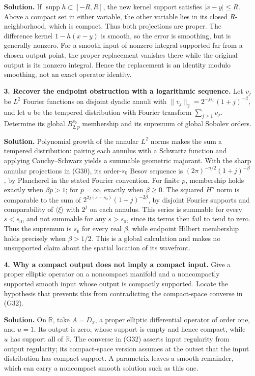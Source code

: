 \documentclass[
  11pt,
]{article}
\begin{document}
\textbf{Solution.} If \(\operatorname{supp}h\subset[-R,R]\), the new
kernel support satisfies \(|x-y|\leq R\). Above a compact set in either
variable, the other variable lies in its closed \(R\)-neighborhood,
which is compact. Thus both projections are proper. The difference
kernel \(1-h(x-y)\) is smooth, so the error is smoothing, but is
generally nonzero. For a smooth input of nonzero integral supported far
from a chosen output point, the proper replacement vanishes there while
the original output is its nonzero integral. Hence the replacement is an
identity modulo smoothing, not an exact operator identity.

\textbf{3. Recover the endpoint obstruction with a logarithmic
sequence.} Let \(v_j\) be \(L^2\) Fourier functions on disjoint dyadic
annuli with \(\|v_j\|_2=2^{-js_0}(1+j)^{-\beta}\), and let \(u\) be the
tempered distribution with Fourier transform \(\sum_{j\geq1}v_j\).
Determine its global \(B^{s_0}_{2,p}\) membership and its supremum of
global Sobolev orders.

\textbf{Solution.} Polynomial growth of the annular \(L^2\) norms makes
the sum a tempered distribution: pairing each annulus with a Schwartz
function and applying Cauchy--Schwarz yields a summable geometric
majorant. With the sharp annular projections in (G30), its order-\(s_0\)
Besov sequence is \((2\pi)^{-n/2}(1+j)^{-\beta}\), by Plancherel in the
stated Fourier convention. For finite \(p\), membership holds exactly
when \(\beta p>1\); for \(p=\infty\), exactly when \(\beta\geq0\). The
squared \(H^s\) norm is comparable to the sum of
\(2^{2j(s-s_0)}(1+j)^{-2\beta}\), by disjoint Fourier supports and
comparability of \(\langle\xi\rangle\) with \(2^j\) on each annulus.
This series is summable for every \(s<s_0\), and not summable for any
\(s>s_0\), since its terms then fail to tend to zero. Thus the supremum
is \(s_0\) for every real \(\beta\), while endpoint Hilbert membership
holds precisely when \(\beta>1/2\). This is a global calculation and
makes no unsupported claim about the spatial location of its wavefront.

\textbf{4. Why a compact output does not imply a compact input.} Give a
proper elliptic operator on a noncompact manifold and a noncompactly
supported smooth input whose output is compactly supported. Locate the
hypothesis that prevents this from contradicting the compact-space
converse in (G32).

\textbf{Solution.} On \(\mathbb R\), take \(A=D_x\), a proper elliptic
differential operator of order one, and \(u=1\). Its output is zero,
whose support is empty and hence compact, while \(u\) has support all of
\(\mathbb R\). The converse in (G32) asserts input regularity from
output regularity; its compact-space version assumes at the outset that
the input distribution has compact support. A parametrix leaves a smooth
remainder, which can carry a noncompact smooth solution such as this
one.
\end{document}
